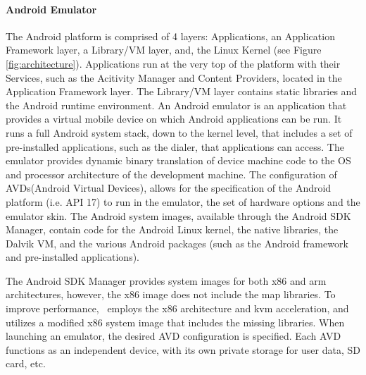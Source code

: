 \paragraph{\bfseries Android Emulator}
The Android platform is comprised of 4 layers: Applications, an Application Framework layer, a Library/VM layer, and, the Linux Kernel (see Figure \ref{fig:architecture}).  Applications run at the very top of the platform with their Services, such as the Acitivity Manager and Content Providers, located in the Application Framework layer.  The Library/VM layer contains static libraries and the Android runtime environment.  An Android emulator is an application that provides a virtual mobile device on which Android applications can be run.  It runs a full Android system stack, down to the kernel level, that includes a set of pre-installed applications, such as the dialer, that applications can access.  The emulator provides dynamic binary translation of device machine code to the OS and processor architecture of the development machine.  The configuration of AVDs(Android Virtual Devices), allows for the specification of the Android platform (i.e. API 17) to run in the emulator, the set of hardware options and the emulator skin.  The Android system images, available through the Android SDK Manager, contain code for the Android Linux kernel, the native libraries, the Dalvik VM, and the various Android packages (such as the Android framework and pre-installed applications).  



The Android SDK Manager provides system images for both x86 and arm architectures, however, the x86 image does not include the map libraries.  To improve performance, \toolname~employs the x86 architecture and kvm acceleration, and utilizes a modified x86 system image that includes the missing libraries.  When launching an emulator, the desired AVD configuration is specified.  Each AVD functions as an independent device, with its own private storage for user data, SD card, etc. 


